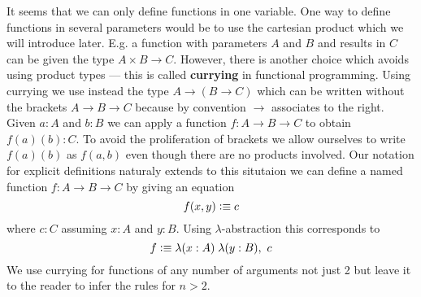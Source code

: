 It seems that we can only define functions in one variable. One
way to define functions in several parameters would be to use the
cartesian product which we will introduce later. E.g. a function with
parameters $A$ and $B$ and results in $C$ can be given the type 
$A \times B \to C$. However, there is another choice which avoids
using product types --- this is called \textbf{currying} in functional
programming. Using currying we use instead the type $A \to (B \to C)$
which can be written without the brackets $A \to B \to C$ because
by convention $\to$ associates to the right. Given $a : A$ and $b : B$
we can apply a function $f : A \to B \to C$ to obtain $f(a)(b) :
C$. To avoid the proliferation of brackets we allow ourselves to
write $f(a)(b)$ as $f(a,b)$ even though there are no products
involved. Our notation for explicit definitions naturaly extends to
this situtaion we can define a named function $f : A \to B \to C$ by
giving an equation
\[ f(x,y) \vcentcolon\equiv c\]
where $c:C$ assuming $x:A$ and $y:B$. Using $\lambda$-abstraction this
corresponds to
\[ f \defeq \lam{x:A}{y:B} c \]
We use currying for functions of any number of arguments not just 2 but
leave it to the reader to infer the rules for $n>2$.
 



